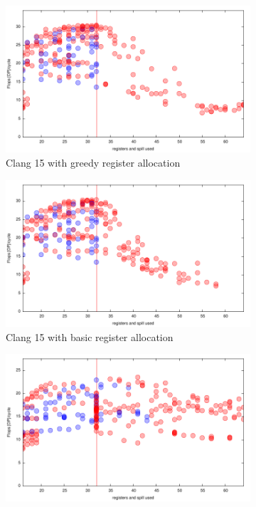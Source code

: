\documentclass[sigconf,review]{acmart}
\begin{document}
\begin{figure}[ht]
\begin{subfigure}[h]{0.45\textwidth}
\includegraphics[width=\textwidth]{../benches/gemm/cascadelake-64x256x64/greedy.pdf}
  \caption{Clang 15 with greedy register allocation}
  \end{subfigure}
  \begin{subfigure}[h]{0.45\textwidth}  
\includegraphics[width=\textwidth]{../benches/gemm/cascadelake-64x256x64/basic.pdf}
  \caption{Clang 15 with basic register allocation}
  \end{subfigure}
  \begin{subfigure}[h]{0.45\textwidth}  
\includegraphics[width=\textwidth]{../benches/gemm/cascadelake-64x256x64/gcc-11.9.pdf}

\end{subfigure}
\end{figure}
\end{document}
